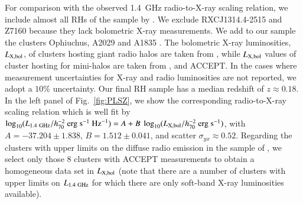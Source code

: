 \documentclass[useAMS,usenatbib]{mn2e}
\begin{document}
\begin{appendix}
For comparison with the observed 1.4~GHz radio-to-X-ray scaling relation, we
include almost all RHs of the sample by \cite{2011A&A...527A..99E}. 
We exclude RXCJ1314.4-2515 and Z7160 because they lack bolometric X-ray measurements. 
We add to our sample the clusters Ophiuchus, A2029 and A1835
\citep{2009A&A...499..371G}. The bolometric X-ray luminosities,
$L_{{\mathrm{X,bol}}}$, of clusters hosting giant radio halos are taken from
\cite{2009A&A...507..661B}, while $L_{{\mathrm{X,bol}}}$ values of cluster hosting
for mini-halos are taken from \cite{2002ApJ...567..716R},
\cite{Boehringer:1998vv} and ACCEPT. In the cases where measurement
uncertainties for X-ray and radio luminosities are not reported, we adopt a
$10\%$ uncertainty. Our final RH sample has a median redshift of
$z\approx0.18$. In the left panel of Fig.~\ref{fig:PLSZ}, we show the
corresponding radio-to-X-ray scaling relation which is well fit by $\log_{10}
(L_{1.4~{\mathrm{GHz}}}/h_{70}^{-2}~{\mathrm{erg}}~{\mathrm{s}}^{-1}~{\mathrm{Hz}}^{-1}) = A +
B~\log_{10} (L_{{\mathrm{X,bol}}}/h_{70}^{-2}~{\mathrm{erg}}~{\mathrm{s}}^{-1})$, with
$A=-37.204\pm1.838$, $B=1.512\pm0.041$, and scatter $\sigma_{yx} \approx
0.52$. Regarding the clusters with upper limits on the diffuse radio emission in
the sample of \cite{2011A&A...527A..99E}, we select only those 8 clusters with
ACCEPT measurements to obtain a homogeneous data set in $L_{{\mathrm{X,bol}}}$ (note
that there are a number of clusters with upper limits on $L_{1.4~{\mathrm{GHz}}}$ for
which there are only soft-band X-ray luminosities available).


\end{appendix}
\end{document}
